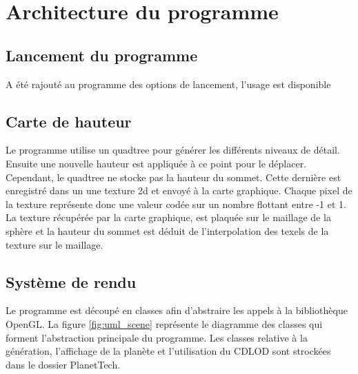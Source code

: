   	
  \chapter{Architecture du programme}
  
  \section{Lancement du programme}
  A été rajouté au programme des options de lancement, l'usage est disponible 
  
  \section{Carte de hauteur}
  
  Le programme utilise un quadtree pour générer les différents niveaux de détail. 
  Ensuite une nouvelle hauteur est appliquée à ce point pour le déplacer. 
  Cependant, le quadtree ne stocke pas la hauteur du sommet. Cette dernière
  est enregistré dans un une texture 2d et envoyé à la carte graphique. 
  Chaque pixel de la texture représente donc une valeur codée sur un nombre flottant entre -1 et 1.
  La texture récupérée par la carte graphique, est plaquée sur le maillage de la sphère et la hauteur du sommet
  est déduit de l'interpolation des texels de la texture sur le maillage.
  
  
  \section{Système de rendu}
  Le programme est découpé en classes afin d'abstraire les appels à la bibliothèque OpenGL. La figure \ref{fig:uml_scene} représente le diagramme des classes qui forment l'abstraction principale du programme.
  Les classes relative à la génération, l'affichage de la planète et l'utilisation du CDLOD sont strockées dans le dossier
  PlanetTech.
  
